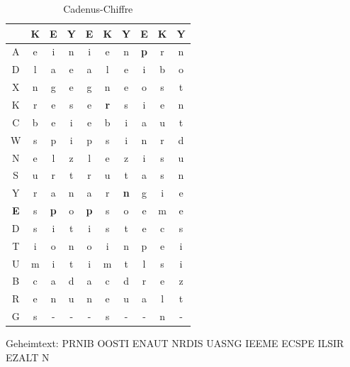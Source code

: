 \begin{refsegment}
\begin{itemize}
   \begin{table}[ht]
   \begin{center}
   \begin{tabular}{|c|ccc|ccc|ccc|}
   \hline
	  & K & {\bf E} & Y & {\bf E} & K & Y & {\bf E} & K & Y\\
   \hline
	A & e & i & n & i & e & n & {\bf p} & r & n\\
	D & l & a & e & a & l & e & i & b & o\\
	X & n & g & e & g & n & e & o & s & t\\
	K & r & e & s & e & {\bf r} & s & i & e & n\\
	C & b & e & i & e & b & i & a & u & t\\
	W & s & p & i & p & s & i & n & r & d\\
	N & e & l & z & l & e & z & i & s & u\\
	S & u & r & t & r & u & t & a & s & n\\
	Y & r & a & n & a & r & {\bf n} & g & i & e\\
	{\bf E} & s & {\bf p} & o & {\bf p} & s & o & e & m & e\\
	D & s & i & t & i & s & t & e & c & s\\
	T & i & o & n & o & i & n & p & e & i\\	
	U & m & i & t & i & m & t & l & s & i\\
	B & c & a & d & a & c & d & r & e & z\\
	R & e & n & u & n & e & u & a & l & t\\
	G & s & - & - & - & s & - & - & n & -\\
   \hline
   \end{tabular}
   \caption[Cadenus]{Cadenus-Chiffre\footnotemark}
   \label{PaP_Cadenus-table-reference}
   \end{center}
   \end{table}%

   Geheimtext: PRNIB OOSTI ENAUT NRDIS UASNG IEEME ECSPE ILSIR EZALT N\\


\end{itemize}
\end{refsegment}
